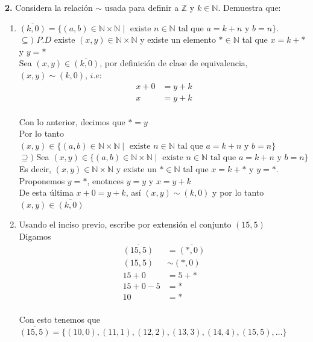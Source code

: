 \documentclass[12pt]{article}
\begin{document}
%
%
\textbf{2.} Considera la relación $\sim$ usada para definir a $\mathbb{Z}$ y $k \in \mathbb{N}$. Demuestra que:
\begin{enumerate}[label=\alph*)]
    \item $\overline{(k, 0)} = \{(a, b) \in \mathbb{N} \times \mathbb{N} \mid \text{ existe } n \in \mathbb{N} \text{ tal que } a = k + n \text{ y } b = n\}$.\\

    $\subseteq)$ 
    $P.D$ existe $(x, y) \in \mathbb{N} \times \mathbb{N}$ y existe un elemento $\ast \in \mathbb{N}$ tal que $x = k + \ast$ y $y =\ast $\\

    Sea $(x, y) \in \overline{(k, 0)}$, por definición de clase de equivalencia, $(x, y) \sim (k, 0)$, $i.e$:
    \begin{align*}
        x + 0 &= y + k\\
        x &= y + k\\
    \end{align*}

    Con lo anterior, decimos que $\ast = y$\\

    Por lo tanto $(x, y) \in \{(a, b) \in \mathbb{N} \times \mathbb{N} \mid \text{ existe } n \in \mathbb{N} \text{ tal que } a = k + n \text{ y } b = n\}$\\
    
    $\supseteq)$ Sea $(x, y) \in \{(a, b) \in \mathbb{N} \times \mathbb{N} \mid \text{ existe } n \in \mathbb{N} \text{ tal que } a = k + n \text{ y } b = n\}$\\

    Es decir, $(x, y) \in \mathbb{N} \times \mathbb{N}$ y existe un $\ast \in \mathbb{N}$ tal que $x = k + \ast$ y $y = \ast$.\\
    
    Proponemos $y = \ast$, enotnces $y = y$ y $x = y + k$\\

    De esta última $x + 0 = y + k$, así $(x, y) \sim (k, 0)$ y por lo tanto $(x, y) \in \overline{(k, 0)}$\\

    \item Usando el inciso previo, escribe por extensión el conjunto $\overline{(15, 5)}$\\

    Digamos 
    \begin{align*}
        \overline{(15, 5)} &= \overline{(\ast, 0)}\\
        (15, 5) &\sim (\ast, 0)\\
        15 + 0 &= 5 + \ast\\
        15 + 0 - 5 &= \ast\\
        10 &= \ast\\
    \end{align*}

    Con esto tenemos que $\overline{(15, 5)} = \{(10, 0), (11, 1), (12, 2), (13, 3), (14, 4), (15, 5), \dots\}$\\
\end{enumerate}
\vspace{1cm}
\end{document}
